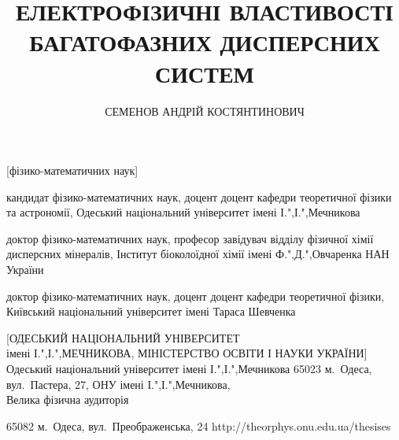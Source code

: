 \documentclass[twoside,a4paper,14pt]{vakaref-utf8}
\begin{document}
\setlength{\abovedisplayskip}{4pt}%
\setlength{\abovedisplayshortskip}{4pt}%
\setlength{\belowdisplayskip}{4pt}%
\setlength{\belowdisplayshortskip}{4pt}%

\author{СЕМЕНОВ АНДРІЙ КОСТЯНТИНОВИЧ}



\title{ЕЛЕКТРОФІЗИЧНІ ВЛАСТИВОСТІ\\ БАГАТОФАЗНИХ ДИСПЕРСНИХ СИСТЕМ}

[фізико-математичних наук]

  {кандидат фізико-математичних наук, доцент}
  {доцент кафедри теоретичної фізики та астрономії, 
  Одеський національний університет імені І.",І.",Мечникова}


  {доктор фізико-математичних наук, професор}
  {завідувач відділу фізичної хімії дисперсних мінералів, Інститут біоколоїдної хімії імені {Ф.",Д.",Овчаренка} НАН України}

  {доктор фізико-математичних наук, доцент}
  {доцент кафедри теоретичної фізики, Київський національний університет імені Тараса Шевченка}

  [ОДЕСЬКИЙ НАЦІОНАЛЬНИЙ УНІВЕРСИТЕТ\\ імені {І.",І.",МЕЧНИКОВА}, МІНІСТЕРСТВО ОСВІТИ І НАУКИ УКРАЇНИ]
  {Одеський національний університет імені {І.",І.",Мечникова}}
  {65023 м.~Одеса, вул.~Пастера, 27, ОНУ імені {І.",І.",Мечникова},\\ Велика фізична аудиторія}


{65082 м.~Одеса, вул.~Преображенська, 24}
{http://theorphys.onu.edu.ua/thesises}


\maketitle
\end{document}
